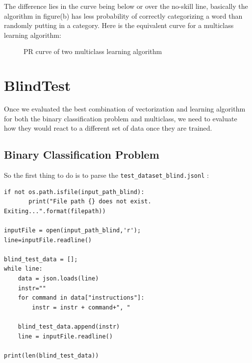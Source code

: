 \documentclass{article}
\begin{document}
The difference lies in the curve being below or over the no-skill line, basically the algorithm in figure(b) has less probability of correctly categorizing a word than randomly putting in a category.
\clearpage
Here is the equivalent curve for a multiclass learning algorithm:
  \begin{figure}[h]
\centering
{}%
\hfill %
%
\caption{PR curve of two multiclass learning algorithm}
\end{figure}

\section{BlindTest}
Once we evaluated the best combination of vectorization and learning algorithm for both the binary classification problem and multiclass, we need to evaluate how they would react  
to a different set of data once they are trained.\\

\subsection{Binary Classification Problem}
So the first thing to do is to parse the \verb|test_dataset_blind.jsonl| :\\

\begin{verbatim}
if not os.path.isfile(input_path_blind):
       print("File path {} does not exist. Exiting...".format(filepath))
        
inputFile = open(input_path_blind,'r');
line=inputFile.readline()

blind_test_data = [];
while line:
    data = json.loads(line)
    instr=""
    for command in data["instructions"]:
        instr = instr + command+", "
        
    blind_test_data.append(instr)
    line = inputFile.readline()
    
print(len(blind_test_data))
\end{verbatim}
\end{document}
